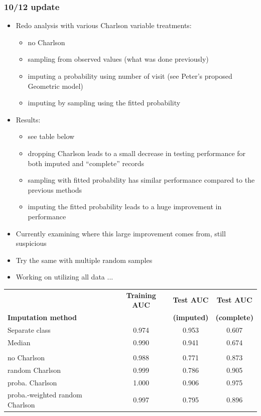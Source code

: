 \documentclass[12pt]{article}
\begin{document}
\pagebreak
\subsubsection*{10/12 update}

\begin{itemize}
	\item Redo analysis with various Charlson variable treatments:
	\begin{itemize}
		\item no Charlson
		\item sampling from observed values (what was done previously)
		\item imputing a probability using number of visit (see Peter's proposed Geometric model)
		\item imputing by sampling using the fitted probability
	\end{itemize}
	\item Results:
	\begin{itemize}
		\item see table below
		\item dropping Charlson leads to a small decrease in testing performance for both imputed and ``complete'' records
		\item sampling with fitted probability has similar performance compared to the previous methods
		\item imputing the fitted probability leads to a huge improvement in performance
	\end{itemize}
	\item Currently examining where this large improvement comes from, still suspicious
	\item Try the same with multiple random samples
	\item Working on utilizing all data ...
\end{itemize}

\begin{table}[ht]
\centering
\begin{tabular}{lccc}
  \toprule
 & \textbf{Training AUC} & \textbf{Test AUC} & \textbf{Test AUC} \\
\textbf{Imputation method}& & \textbf{(imputed)} & \textbf{(complete)} \\
  \midrule
Separate class & 0.974 & 0.953 & 0.607 \\ \addlinespace
  Median & 0.990 & 0.941 & 0.674 \\ \addlinespace
  \multicolumn{4}{l}{\textbf{Simple random sample}} \\
  no Charlson & 0.988 & 0.771 & 0.873 \\ 
  random Charlson & 0.999 & 0.786 & 0.905 \\ 
  proba. Charlson & 1.000 & 0.906 & 0.975 \\ 
  proba.-weighted random Charlson & 0.997 & 0.795 & 0.896 \\ 
   \bottomrule
\end{tabular}
\end{table}
\end{document}
